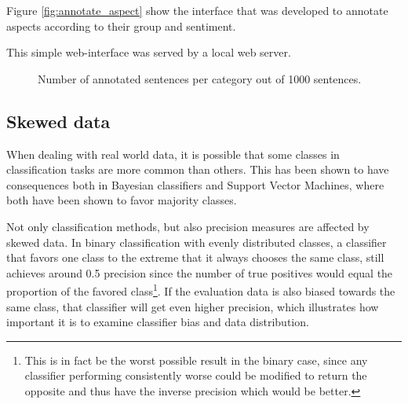 \documentclass[a4paper,11pt]{kth-mag}
\begin{document}
Figure \ref{fig:annotate_aspect} show the interface that was developed to annotate aspects
according to their group and sentiment.

This simple web-interface was served by a local web server.

\begin{figure}[t]
  \centering
  \caption{Number of annotated sentences per category out of 1000 sentences.}
  \label{fig:cat_count}
\end{figure}

\clearpage


\subsection{Skewed data}
\label{subsec:bias}
When dealing with real world data, it is possible that some classes in classification tasks are more
common than others. This has been shown to have consequences both in Bayesian classifiers\cite{rennie2003bias}
and Support Vector Machines\cite{svm_bias}, where both have been shown to favor majority
classes\cite{rennie2003bias, svm_bias}.


Not only classification methods, but also precision measures are affected by skewed data. In binary
classification with evenly distributed classes, a classifier that favors one class to the extreme that it
always chooses the same class, still achieves around 0.5 precision since the number of true positives
would equal the proportion of the favored class\footnote{This is in fact be the worst possible result
in the binary case, since any classifier performing consistently worse could be modified to return the
opposite and thus have the inverse precision which would be better.}.
If the evaluation data is also biased towards the same class, that classifier will get even
higher precision, which illustrates how important it is to examine classifier
bias and data distribution.
\end{document}
